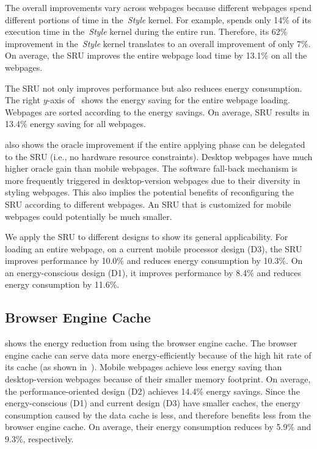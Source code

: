 The overall improvements vary across webpages because different webpages spend different portions of time in the~\textit{Style} kernel. For example,  spends only 14\% of its execution time in the~\textit{Style} kernel during the entire run. Therefore, its 62\% improvement in the~\textit{Style} kernel translates to an overall improvement of only 7\%. On average, the SRU improves the entire webpage load time by 13.1\% on all the webpages.

The SRU not only improves performance but also reduces energy consumption. The right $y$-axis of~ shows the energy saving for the entire webpage loading. Webpages are sorted according to the energy savings. On average, SRU results in 13.4\% energy saving for all webpages.

 also shows the oracle improvement if the entire applying phase can be delegated to the SRU (i.e., no hardware resource constraints). Desktop webpages have much higher oracle gain than mobile webpages. The software fall-back mechanism is more frequently triggered in desktop-version webpages due to their diversity in styling webpages. This also implies the potential benefits of reconfiguring the SRU according to different webpages. An SRU that is customized for mobile webpages could potentially be much smaller.

We apply the SRU to different designs to show its general applicability. For loading an entire webpage, on a current mobile processor design (D3), the SRU improves performance by 10.0\% and reduces energy consumption by 10.3\%. On an energy-conscious design (D1), it improves performance by 8.4\% and reduces energy consumption by 11.6\%.

\subsection{Browser Engine Cache}
\label{sec:arch:eval:cache}

 shows the energy reduction from using the browser engine cache. The browser engine cache can serve data more energy-efficiently because of the high hit rate of its cache (as shown in~). Mobile webpages achieve less energy saving than desktop-version webpages because of their smaller memory footprint. On average, the performance-oriented design (D2) achieves 14.4\% energy savings. Since the energy-conscious (D1) and current design (D3) have smaller caches, the energy consumption caused by the data cache is less, and therefore benefits less from the browser engine cache. On average, their energy consumption reduces by 5.9\% and 9.3\%, respectively.

